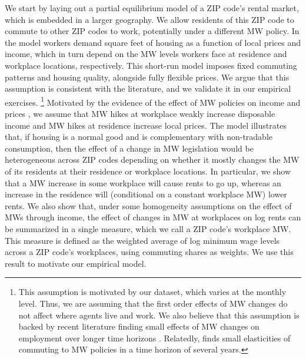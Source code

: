 We start by laying out a partial equilibrium model of a ZIP code's rental market,
which is embedded in a larger geography.
We allow residents of this ZIP code to commute to other ZIP codes to work, 
potentially under a different MW policy.
In the model workers demand square feet of housing as a function of local prices 
and income, which in turn depend on the MW levels workers face at residence and 
workplace locations, respectively.
This short-run model imposes fixed commuting patterns and housing quality, 
alongside fully flexible prices.
We argue that this assumption is consistent with the literature, and 
we validate it in our empirical exercises.%
\footnote{This assumption is motivated by our dataset, which varies at the 
monthly level. Thus, we are assuming that the first order effects of 
MW changes do not affect where agents live and work.
We also believe that this assumption is backed by recent literature
finding small effects of MW changes on employment over longer time horizons
\parencite[see][for a review]{Dube2019}.
Relatedly, \textcite{PerezPerez2021} finds small elasticities of commuting to MW 
policies in a time horizon of several years.}
Motivated by the evidence of the effect of MW policies on 
income \parencite{Dube2019Income, CegnizEtAl2019} and 
prices \parencite{AllegrettoReich2018, Leung2021},
we assume that MW hikes at workplace weakly increase disposable income and MW 
hikes at residence increase local prices.
The model illustrates that, if housing is a normal good and is complementary 
with non-tradable consumption, then the effect of a change in MW legislation 
would be heterogeneous across ZIP codes depending on whether it mostly changes 
the MW of its residents at their residence or workplace locations.
In particular, we show that a MW increase in some workplace will cause rents to 
go up, whereas an increase in the residence will (conditional on a constant 
workplace MW) lower rents.
We also show that, under some homogeneity assumptions on the effect of MWs 
through income, the effect of changes in MW at workplaces on log rents can be 
summarized in a single measure, which we call a ZIP code's workplace MW.
This measure is defined as the weighted average of log minimum wage levels 
across a ZIP code's workplaces, using commuting shares as weights.
We use this result to motivate our empirical model.


